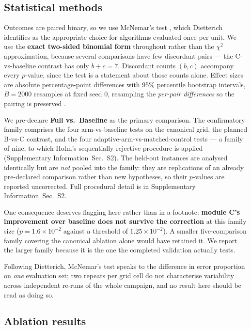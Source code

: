 \documentclass[preprint,11pt]{elsarticle}
\newcommand{\SI}{Supplementary Information}
\newcommand{\SItables}{\SI{}~Sec.~S2}
\begin{document}
\subsection{Statistical methods}
\label{sec:stats}

Outcomes are paired binary, so we use McNemar's test \cite{mcnemar1947},
which Dietterich \cite{dietterich1998} identifies as the appropriate
choice for algorithms evaluated once per unit. We use the \textbf{exact
two-sided binomial form} throughout rather than the $\chi^2$
approximation, because several comparisons have few discordant pairs ---
the C-vs-baseline contrast has only $b+c=7$. Discordant counts $(b,c)$
accompany every $p$-value, since the test is a statement about those
counts alone. Effect sizes are absolute percentage-point differences with
95\% percentile bootstrap intervals, $B=2000$ resamples at fixed seed 0,
resampling the \emph{per-pair differences} so the pairing is preserved
\cite{efron1993}.

We pre-declare \textbf{Full vs.\ Baseline} as the primary comparison. The
confirmatory family comprises the four arm-vs-baseline tests on the
canonical grid, the planned B-vs-C contrast, and the four
adaptive-arm-vs-matched-control tests --- a family of nine, to which
Holm's sequentially rejective procedure \cite{holm1979} is applied
(\SItables{}). The held-out instances are analysed identically
but are \emph{not} pooled into the family: they are replications of an
already pre-declared comparison rather than new hypotheses, so their
$p$-values are reported uncorrected. Full procedural detail is in
\SItables{}.

One consequence deserves flagging here rather than in a footnote:
\textbf{module C's improvement over baseline does not survive the
correction} at this family size ($p=1.6\times10^{-2}$ against a threshold
of $1.25\times10^{-2}$). A smaller five-comparison family covering the
canonical ablation alone would have retained it. We report the larger
family because it is the one the completed validation actually tests.

Following Dietterich, McNemar's test speaks to the difference in error
proportion on \emph{one} evaluation set; two repeats per grid cell do not
characterise variability across independent re-runs of the whole
campaign, and no result here should be read as doing so.

\subsection{Ablation results}
\label{sec:results}
\end{document}
